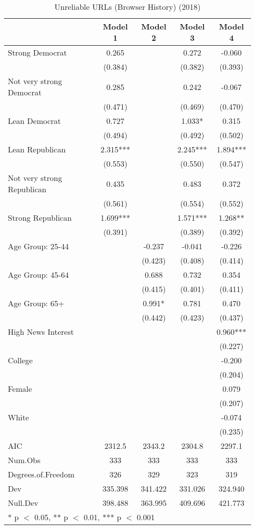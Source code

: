\begin{table}

\caption{Unreliable URLs (Browser History) (2018)}
\centering
\begin{tabular}[t]{lcccc}
\toprule
  & Model 1 & Model 2 & Model 3 & Model 4\\
\midrule
Strong Democrat & 0.265 &  & 0.272 & -0.060\\
 & (0.384) &  & (0.382) & (0.393)\\
Not very strong Democrat & 0.285 &  & 0.242 & -0.067\\
 & (0.471) &  & (0.469) & (0.470)\\
Lean Democrat & 0.727 &  & 1.033* & 0.315\\
 & (0.494) &  & (0.492) & (0.502)\\
Lean Republican & 2.315*** &  & 2.245*** & 1.894***\\
 & (0.553) &  & (0.550) & (0.547)\\
Not very strong Republican & 0.435 &  & 0.483 & 0.372\\
 & (0.561) &  & (0.554) & (0.552)\\
Strong Republican & 1.699*** &  & 1.571*** & 1.268**\\
 & (0.391) &  & (0.389) & (0.392)\\
Age Group: 25-44 &  & -0.237 & -0.041 & -0.226\\
 &  & (0.423) & (0.408) & (0.414)\\
Age Group: 45-64 &  & 0.688 & 0.732 & 0.354\\
 &  & (0.415) & (0.401) & (0.411)\\
Age Group: 65+ &  & 0.991* & 0.781 & 0.470\\
 &  & (0.442) & (0.423) & (0.437)\\
High News Interest &  &  &  & 0.960***\\
 &  &  &  & (0.227)\\
College &  &  &  & -0.200\\
 &  &  &  & (0.204)\\
Female &  &  &  & 0.079\\
 &  &  &  & (0.207)\\
White &  &  &  & -0.074\\
 &  &  &  & (0.235)\\
\midrule
AIC & 2312.5 & 2343.2 & 2304.8 & 2297.1\\
Num.Obs & 333 & 333 & 333 & 333\\
Degrees.of.Freedom & 326 & 329 & 323 & 319\\
Dev & 335.398 & 341.422 & 331.026 & 324.940\\
Null.Dev & 398.488 & 363.995 & 409.696 & 421.773\\
\bottomrule
\multicolumn{5}{l}{\rule{0pt}{1em}* p $<$ 0.05, ** p $<$ 0.01, *** p $<$ 0.001}\\
\end{tabular}
\end{table}
